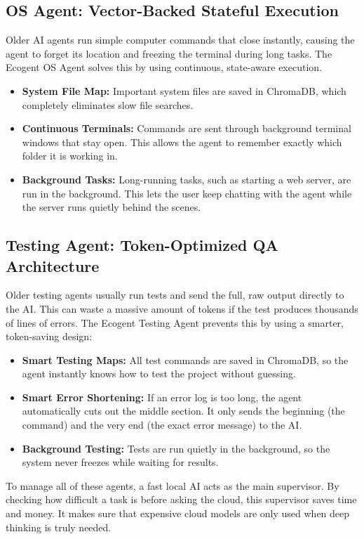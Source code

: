 \subsection{OS Agent: Vector-Backed Stateful Execution}
Older AI agents run simple computer commands that close instantly, causing the agent to forget its location and freezing the terminal during long tasks. The Ecogent OS Agent solves this by using continuous, state-aware execution. 
\begin{itemize}
    \item \textbf{System File Map:} Important system files are saved in ChromaDB, which completely eliminates slow file searches.
    \item \textbf{Continuous Terminals:} Commands are sent through background terminal windows that stay open. This allows the agent to remember exactly which folder it is working in.
    \item \textbf{Background Tasks:} Long-running tasks, such as starting a web server, are run in the background. This lets the user keep chatting with the agent while the server runs quietly behind the scenes.
\end{itemize}

\subsection{Testing Agent: Token-Optimized QA Architecture}
Older testing agents usually run tests and send the full, raw output directly to the AI. This can waste a massive amount of tokens if the test produces thousands of lines of errors. The Ecogent Testing Agent prevents this by using a smarter, token-saving design:
\begin{itemize}
    \item \textbf{Smart Testing Maps:} All test commands are saved in ChromaDB, so the agent instantly knows how to test the project without guessing.
    \item \textbf{Smart Error Shortening:} If an error log is too long, the agent automatically cuts out the middle section. It only sends the beginning (the command) and the very end (the exact error message) to the AI.
    \item \textbf{Background Testing:} Tests are run quietly in the background, so the system never freezes while waiting for results.
\end{itemize}

To manage all of these agents, a fast local AI acts as the main supervisor. By checking how difficult a task is before asking the cloud, this supervisor saves time and money. It makes sure that expensive cloud models are only used when deep thinking is truly needed.\\

